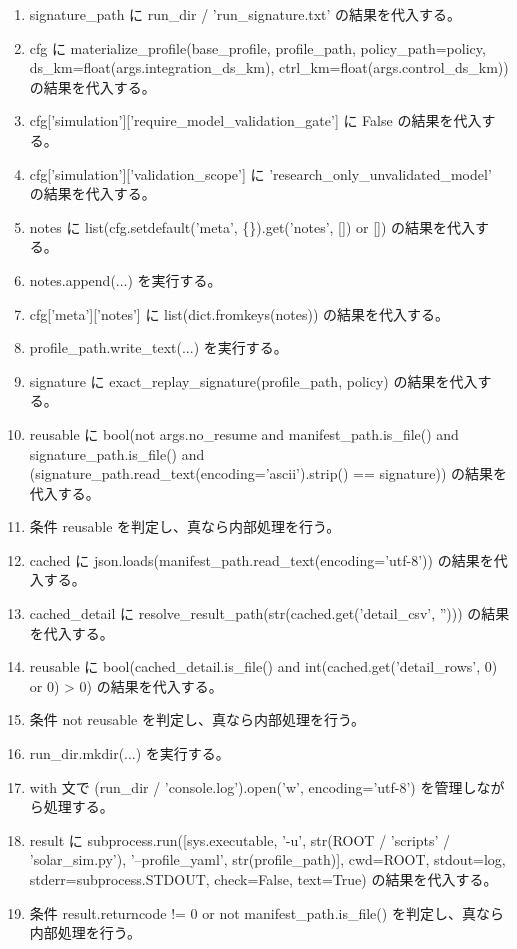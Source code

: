 \documentclass[a4paper,11pt]{article}
\begin{document}
\begin{enumerate}[leftmargin=1.8em]
\item   signature\_path に run\_dir / 'run\_signature.txt' の結果を代入する。
\item   cfg に materialize\_profile(base\_profile, profile\_path, policy\_path=policy, ds\_km=float(args.integration\_ds\_km), ctrl\_km=float(args.control\_ds\_km)) の結果を代入する。
\item   cfg['simulation']['require\_model\_validation\_gate'] に False の結果を代入する。
\item   cfg['simulation']['validation\_scope'] に 'research\_only\_unvalidated\_model' の結果を代入する。
\item   notes に list(cfg.setdefault('meta', \{\}).get('notes', []) or []) の結果を代入する。
\item   notes.append(...) を実行する。
\item   cfg['meta']['notes'] に list(dict.fromkeys(notes)) の結果を代入する。
\item   profile\_path.write\_text(...) を実行する。
\item   signature に exact\_replay\_signature(profile\_path, policy) の結果を代入する。
\item   reusable に bool(not args.no\_resume and manifest\_path.is\_file() and signature\_path.is\_file() and (signature\_path.read\_text(encoding='ascii').strip() == signature)) の結果を代入する。
\item   条件 reusable を判定し、真なら内部処理を行う。
\item     cached に json.loads(manifest\_path.read\_text(encoding='utf-8')) の結果を代入する。
\item     cached\_detail に resolve\_result\_path(str(cached.get('detail\_csv', ''))) の結果を代入する。
\item     reusable に bool(cached\_detail.is\_file() and int(cached.get('detail\_rows', 0) or 0) > 0) の結果を代入する。
\item   条件 not reusable を判定し、真なら内部処理を行う。
\item     run\_dir.mkdir(...) を実行する。
\item     with 文で (run\_dir / 'console.log').open('w', encoding='utf-8') を管理しながら処理する。
\item       result に subprocess.run([sys.executable, '-u', str(ROOT / 'scripts' / 'solar\_sim.py'), '--profile\_yaml', str(profile\_path)], cwd=ROOT, stdout=log, stderr=subprocess.STDOUT, check=False, text=True) の結果を代入する。
\item     条件 result.returncode != 0 or not manifest\_path.is\_file() を判定し、真なら内部処理を行う。

\end{enumerate}
\end{document}
